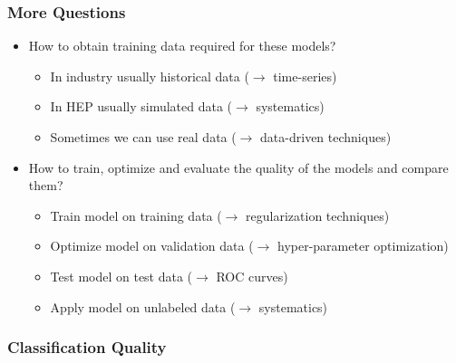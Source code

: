 \begin{frame}
    \frametitle{More Questions}
    \begin{center}
		\begin{itemize}
			\item How to obtain training data required for these models?
			\begin{itemize}
				\item In industry usually historical data ($\rightarrow$ time-series)
				\item In HEP usually simulated data ($\rightarrow$ systematics)	
				\item Sometimes we can use real data ($\rightarrow$ data-driven techniques)
			\end{itemize}
			\item How to train, optimize and evaluate the quality of the models and compare them?
			\begin{itemize}
				\item Train model on training data ($\rightarrow$ regularization techniques)
				\item Optimize model on validation data ($\rightarrow$ hyper-parameter optimization)
				\item Test model on test data ($\rightarrow$ ROC curves)
				\item Apply model on unlabeled data ($\rightarrow$ systematics)
			\end{itemize}
		\end{itemize}
    \end{center}
\end{frame}

\begin{frame}
    \frametitle{Classification Quality}
    \begin{center}
    \end{center}
\end{frame}
